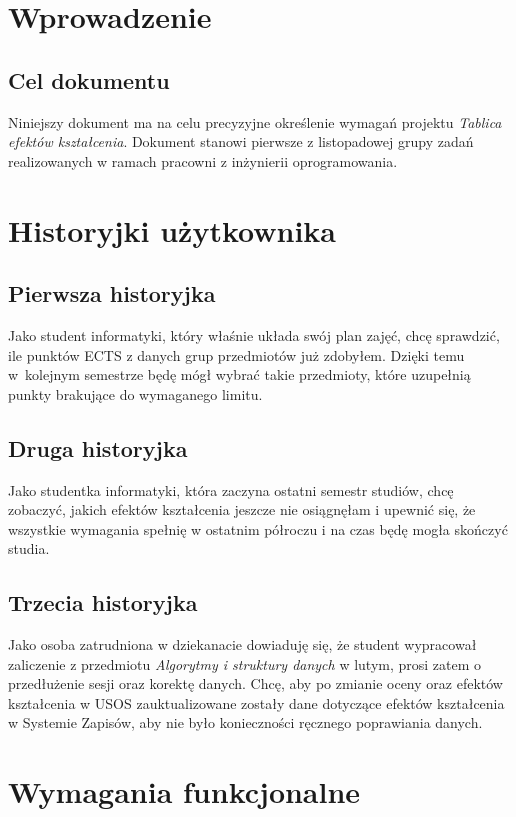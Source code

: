 \documentclass{article}
\begin{document}
\tableofcontents

\newpage


\section{Wprowadzenie}

\subsection{Cel dokumentu}
Niniejszy dokument ma na celu precyzyjne określenie wymagań projektu \textit{Tablica efektów kształcenia}.
Dokument stanowi pierwsze z listopadowej grupy zadań realizowanych w ramach pracowni z inżynierii oprogramowania.


\section{Historyjki użytkownika}
\subsection{Pierwsza historyjka}
Jako student informatyki, który właśnie układa swój plan zajęć, chcę sprawdzić, ile punktów ECTS z danych grup przedmiotów już zdobyłem.
Dzięki temu w~kolejnym semestrze będę mógł wybrać takie przedmioty, które uzupełnią punkty brakujące do wymaganego limitu.
\subsection{Druga historyjka}
Jako studentka informatyki, która zaczyna ostatni semestr studiów, chcę zobaczyć, jakich efektów kształcenia jeszcze nie osiągnęłam i upewnić się, że wszystkie wymagania spełnię w ostatnim półroczu i na czas będę mogła skończyć studia.
\subsection{Trzecia historyjka}
Jako osoba zatrudniona w dziekanacie dowiaduję się, że student wypracował zaliczenie z przedmiotu \textit{Algorytmy i struktury danych} w lutym, prosi zatem o przedłużenie sesji oraz korektę danych. 
Chcę, aby po zmianie oceny oraz efektów kształcenia w USOS zauktualizowane zostały dane dotyczące efektów kształcenia w Systemie Zapisów, aby nie było konieczności ręcznego poprawiania danych.


\section{Wymagania funkcjonalne}
\end{document}
